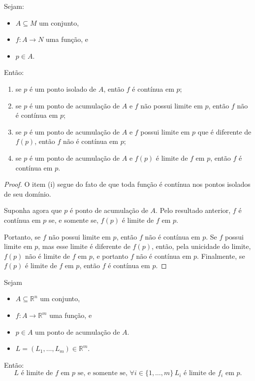 \begin{corollary}
    Sejam:
    \begin{itemize}
        \item $A\subseteq M$ um conjunto,
        \item $f: A \to N$ uma função, e
        \item $p \in A$.
    \end{itemize}
    Então:
    \begin{enumerate}[label=(\roman*)]
        \item se $p$ é um ponto isolado de $A$, então $f$ é contínua em $p$;
        \item se $p$ é um ponto de acumulação de $A$ e $f$ não possui limite em $p$, então $f$ não é contínua em $p$;
        \item se $p$ é um ponto de acumulação de $A$ e $f$ possui limite em $p$ que é diferente de $f(p)$, então $f$ não é contínua em $p$;
        \item se $p$ é um ponto de acumulação de $A$ e $f(p)$ é limite de $f$ em $p$, então $f$ é contínua em $p$.
    \end{enumerate}
\end{corollary}
\begin{proof}
    O item (i) segue do fato de que toda função é contínua nos pontos isolados de seu domínio.

    Suponha agora que $p$ é ponto de acumulação de $A$.
    Pelo resultado anterior, $f$ é contínua em $p$ se, e somente se, $f(p)$ é limite de $f$ em $p$.

    Portanto, se $f$ não possui limite em $p$, então $f$ não é contínua em $p$.
    Se $f$ possui limite em $p$, mas esse limite é diferente de $f(p)$, então, pela unicidade do limite, $f(p)$ não é limite de $f$ em $p$, e portanto $f$ não é contínua em $p$.
    Finalmente, se $f(p)$ é limite de $f$ em $p$, então $f$ é contínua em $p$.
\end{proof}


\begin{proposition}Sejam
    \begin{itemize}
        \item $A\subseteq \mathbb R^n$ um conjunto,
        \item $f: A \to \mathbb R^m$ uma função, e
        \item $p \in A$ um ponto de acumulação de $A$.
        \item $L=(L_1, \dots, L_m)\in \mathbb R^m$.
    \end{itemize}

    Então:
    \[
        L \text{ é limite de } f \text{ em } p \text{ se, e somente se, } \forall i \in \{1, \dots, m\}\, L_i \text{ é limite de } f_i \text{ em } p.
    \]
\end{proposition}

